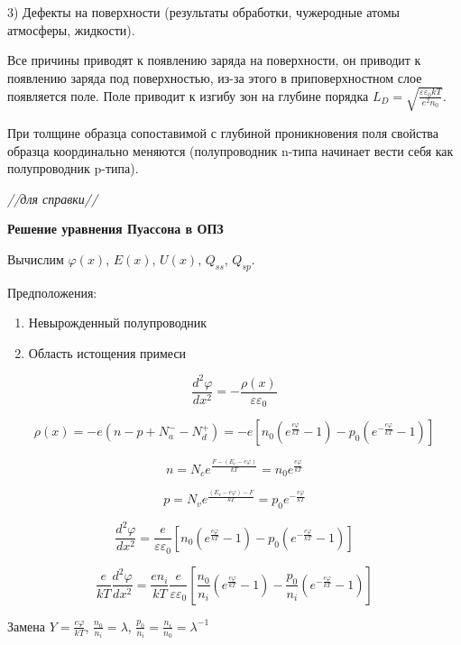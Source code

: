 3) Дефекты на поверхности (результаты обработки, чужеродные атомы атмосферы, жидкости).

Все причины приводят к появлению заряда на поверхности, он приводит к появлению заряда под поверхностью, из-за этого в приповерхностном слое появляется поле. Поле приводит к изгибу зон на глубине порядка $L_D=\sqrt{\frac{\varepsilon \varepsilon_0 k T}{e^2 n_0}}$.

\begin{figure}[h!]
    \centering
\end{figure}

При толщине образца сопоставимой с глубиной проникновения поля свойства образца координально меняются (полупроводник n-типа начинает вести себя как полупроводник p-типа).


\textit{//для справки//}

\textbf{Решение уравнения Пуассона в ОПЗ}

Вычислим $\varphi(x)$, $E(x)$, $U(x)$, $Q_{ss}$, $Q_{sp}$.

Предположения:

\begin{enumerate}
    \item Невырожденный полупроводник
    \item Область истощения примеси
\end{enumerate}

$$
\frac{d^2 \varphi}{d x^2}=-\frac{\rho(x)}{\varepsilon \varepsilon_0}
$$

$$
\rho(x)=-e\left(n-p+N_a^{-}-N_d^{+}\right)=-e\left[n_0\left(e^{\frac{e \varphi}{k T}}-1\right)-p_0\left(e^{-\frac{e \varphi}{k T}}-1\right)\right]
$$


$$
n=N_c e^{\frac{F-\left(E_c-e \varphi\right)}{k T}}=n_0 e^{\frac{e \varphi}{k T}}
$$

$$
p=N_v e^{\frac{\left(E_v-e \varphi \right)-F}{k T}}=p_0 e^{-\frac{e \varphi}{k T}}
$$

$$
\frac{d^2 \varphi}{d x^2}=\frac{e}{\varepsilon \varepsilon_0}\left[n_0\left(e^{\frac{e \varphi}{k T}}-1\right)-p_0\left(e^{-\frac{e \varphi}{k T}}-1\right)\right]
$$

$$
\frac{e}{k T} \frac{d^2 \varphi}{d x^2}=\frac{e n_i}{k T}  \frac{e}{\varepsilon \varepsilon_0}\left[\frac{n_0}{n_i}\left(e^{\frac{e \varphi}{k T}}-1\right)-\frac{p_0}{n_i}\left(e^{-\frac{e \varphi}{k T}}-1\right)\right]
$$

Замена $Y=\frac{e\varphi}{kT}$, $\frac{n_0}{n_i}=\lambda$, $\frac{p_0}{n_i}=\frac{n_i}{n_0}=\lambda^{-1}$

